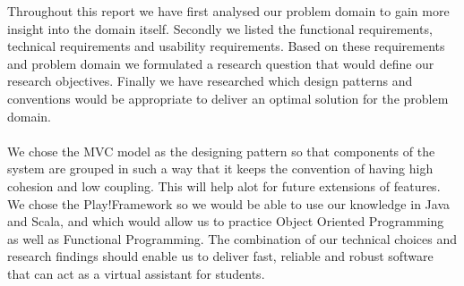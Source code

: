 Throughout this report we have first analysed our problem domain to gain more insight into the domain itself. Secondly we listed the functional requirements, technical requirements and usability requirements. Based on these requirements and problem domain we formulated a research question that would define our research objectives. Finally we have researched which design patterns and conventions would be appropriate to deliver an optimal solution for the problem domain.\\\\
We chose the MVC model as the designing pattern so that components of the system are grouped in such a way that it keeps the convention of having high cohesion and low coupling. This will help alot for future extensions of features. We chose the Play!Framework so we would be able to use our knowledge in Java and Scala, and which would allow us to practice Object Oriented Programming as well as Functional Programming. The combination of our technical choices and research findings should enable us to deliver fast, reliable and robust software that can act as a virtual assistant for students.

